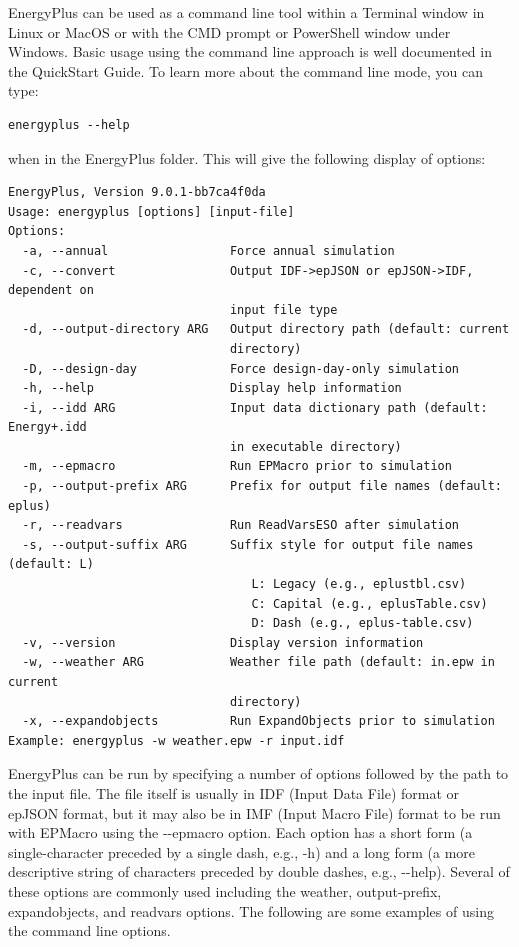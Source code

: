 EnergyPlus can be used as a command line tool within a Terminal window
in Linux or MacOS or with the CMD prompt or PowerShell window under
Windows. Basic usage using the command line approach is well documented
in the QuickStart Guide. To learn more about the command line mode,
you can type:
\begin{verbatim}
energyplus --help 
\end{verbatim}
when in the EnergyPlus folder. This will give the following display
of options:
\begin{verbatim}
EnergyPlus, Version 9.0.1-bb7ca4f0da
Usage: energyplus [options] [input-file]
Options:
  -a, --annual                 Force annual simulation
  -c, --convert                Output IDF->epJSON or epJSON->IDF, dependent on
                               input file type
  -d, --output-directory ARG   Output directory path (default: current
                               directory)
  -D, --design-day             Force design-day-only simulation
  -h, --help                   Display help information
  -i, --idd ARG                Input data dictionary path (default: Energy+.idd
                               in executable directory)
  -m, --epmacro                Run EPMacro prior to simulation
  -p, --output-prefix ARG      Prefix for output file names (default: eplus)
  -r, --readvars               Run ReadVarsESO after simulation
  -s, --output-suffix ARG      Suffix style for output file names (default: L)
                                  L: Legacy (e.g., eplustbl.csv)
                                  C: Capital (e.g., eplusTable.csv)
                                  D: Dash (e.g., eplus-table.csv)
  -v, --version                Display version information
  -w, --weather ARG            Weather file path (default: in.epw in current
                               directory)
  -x, --expandobjects          Run ExpandObjects prior to simulation
Example: energyplus -w weather.epw -r input.idf
\end{verbatim}
EnergyPlus can be run by specifying a number of options followed by
the path to the input file. The file itself is usually in IDF (Input
Data File) format or epJSON format, but it may also be in IMF (Input
Macro File) format to be run with EPMacro using the -{}-epmacro option.
Each option has a short form (a single-character preceded by a single
dash, e.g., \textquotedbl -h\textquotedbl ) and a long form (a more
descriptive string of characters preceded by double dashes, e.g.,
\textquotedbl -{}-help\textquotedbl ). Several of these options
are commonly used including the weather, output-prefix, expandobjects,
and readvars options. The following are some examples of using the
command line options. 


